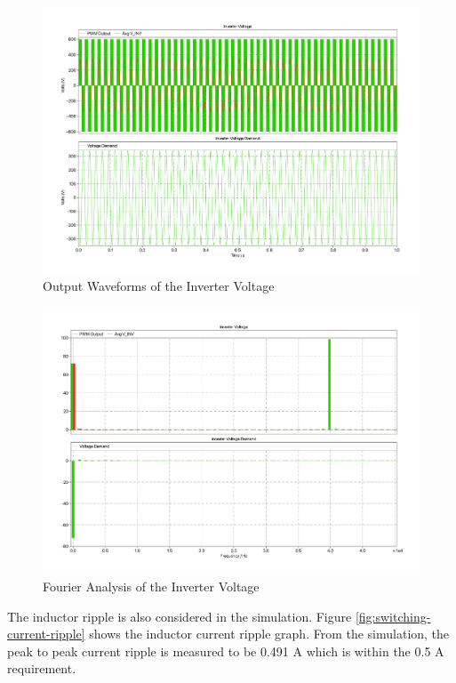 \documentclass[12pt]{article}
\begin{document}
\begin{figure}[ht]
    \centering{}
    \includegraphics[width=\textwidth, height=0.4\textheight, keepaspectratio]{img/Switching Inverter Voltage.pdf}
    \caption{Output Waveforms of the Inverter Voltage}
    \label{fig:switching-inverter-voltage}
\end{figure}

\begin{figure}[ht]
    \centering{}
    \includegraphics[width=\textwidth, height=0.4\textheight, keepaspectratio]{img/Switching Demand FFT.pdf}
    \caption{Fourier Analysis of the Inverter Voltage}
    \label{fig:switching-fourier}
\end{figure}

The inductor ripple is also considered in the simulation.
Figure \ref{fig:switching-current-ripple} shows the inductor current ripple graph.
From the simulation, the peak to peak current ripple is measured to be 0.491 A which is within the 0.5 A requirement.
\end{document}
